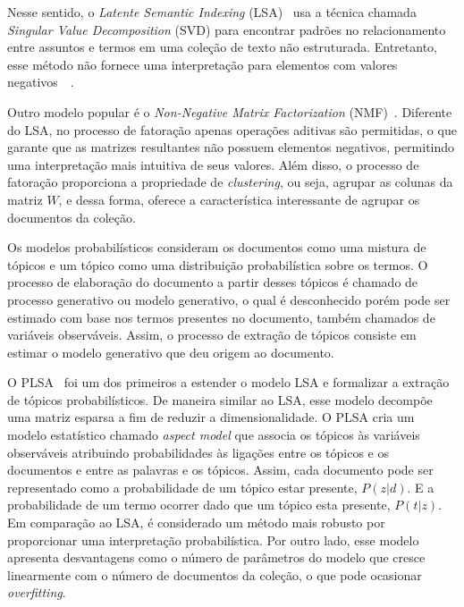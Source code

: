 Nesse sentido, o \textit{Latente Semantic Indexing} (LSA)~\cite{Deerwester1990} usa a técnica chamada \textit{Singular Value Decomposition} (SVD) para encontrar padrões no relacionamento entre assuntos e termos em uma coleção de texto não estruturada. Entretanto, esse método não fornece uma interpretação para elementos com valores negativos~\cite{Deerwester1990}~\cite{Cheng2013}. %

Outro modelo popular é o \textit{Non-Negative Matrix Factorization} (NMF)~\cite{Lee1999}.  Diferente do LSA, no processo de fatoração apenas operações aditivas são permitidas, o que garante que as matrizes resultantes não possuem elementos negativos, permitindo uma interpretação mais intuitiva de seus valores. Além disso, o processo de fatoração proporciona a propriedade de \textit{clustering}, ou seja, agrupar as colunas da matriz $W$, e dessa forma, oferece a característica interessante de agrupar os documentos da coleção.  %



Os modelos probabilísticos consideram os documentos como uma mistura de tópicos e um tópico como uma distribuição probabilística sobre os termos. O processo de elaboração do documento a partir desses tópicos é chamado de processo generativo ou modelo generativo, o qual é desconhecido porém pode ser estimado com base nos termos presentes no documento, também chamados de variáveis observáveis. Assim, o processo de extração de tópicos consiste em estimar o modelo generativo que deu origem ao documento.
 
O PLSA~\cite{Hofmann1999} foi um dos primeiros a estender o modelo LSA e formalizar a extração de tópicos probabilísticos. De maneira similar ao LSA, esse modelo decompõe uma matriz esparsa a fim de reduzir a dimensionalidade. O PLSA cria um modelo estatístico chamado \textit{aspect model} que associa os tópicos às variáveis observáveis atribuindo probabilidades às ligações entre os tópicos e os documentos e entre as palavras e os tópicos. Assim, cada documento pode ser representado como a probabilidade de um tópico estar presente, $P(z|d)$. E a probabilidade de um termo ocorrer dado que um tópico esta presente, $P(t|z)$. Em comparação ao LSA, é considerado um método mais robusto por proporcionar uma interpretação probabilística. Por outro lado, esse modelo apresenta desvantagens como o número de parâmetros do modelo que cresce linearmente com o número de documentos da coleção, o que pode ocasionar \textit{overfitting}.   %

